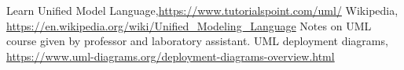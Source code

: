 \begin{thebibliography}{99999}
\singlespace\normalsize

 Learn Unified Model Language,\url{https://www.tutorialspoint.com/uml/}
 Wikipedia, \url{https://en.wikipedia.org/wiki/Unified_Modeling_Language}
 Notes on UML course given by professor and laboratory assistant.
UML deployment diagrams, \url{https://www.uml-diagrams.org/deployment-diagrams-overview.html}




\end{thebibliography}
